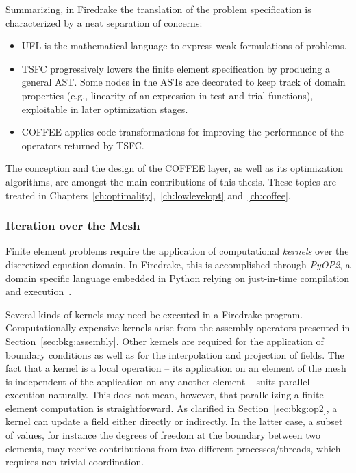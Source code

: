 Summarizing, in Firedrake the translation of the problem specification is characterized by a neat separation of concerns:
\begin{itemize}
\item UFL is the mathematical language to express weak formulations of problems.
\item TSFC progressively lowers the finite element specification by producing a general AST. Some nodes in the ASTs are decorated to keep track of domain properties (e.g., linearity of an expression in test and trial functions), exploitable in later optimization stages.
\item COFFEE applies code transformations for improving the performance of the operators returned by TSFC. 
\end{itemize}

The conception and the design of the COFFEE layer, as well as its optimization algorithms, are amongst the main contributions of this thesis. These topics are treated in Chapters~\ref{ch:optimality},~\ref{ch:lowlevelopt} and~\ref{ch:coffee}.

\subsubsection{Iteration over the Mesh}
\label{sec:bkg:meshiteration}
Finite element problems require the application of computational {\em kernels} over the discretized equation domain. In Firedrake, this is accomplished through {\em PyOP2}, a domain specific language embedded in Python relying on just-in-time compilation and execution~\citep{pyop2isc}. 

Several kinds of kernels may need be executed in a Firedrake program. Computationally expensive kernels arise from the assembly operators presented in Section~\ref{sec:bkg:assembly}. Other kernels are required for the application of boundary conditions as well as for the interpolation and projection of fields. The fact that a kernel is a local operation -- its application on an element of the mesh is independent of the application on any another element -- suits parallel execution naturally. This does not mean, however, that parallelizing a finite element computation is straightforward. As clarified in Section~\ref{sec:bkg:op2}, a kernel can update a field either directly or indirectly. In the latter case, a subset of values, for instance the degrees of freedom at the boundary between two elements, may receive contributions from two different processes/threads, which requires non-trivial coordination.

